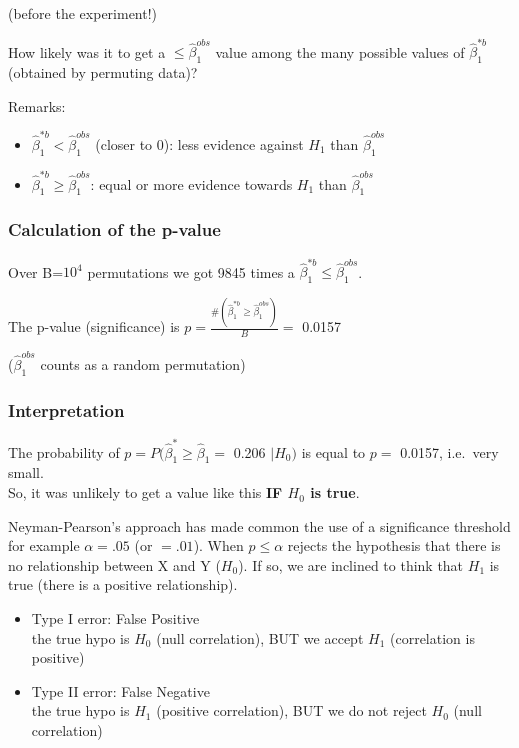 \documentclass[
]{article}
\providecommand{\tightlist}{%
  \setlength{\itemsep}{0pt}\setlength{\parskip}{0pt}}
\begin{document}
(before the experiment!)

How likely was it to get a \(\leq \hat{\beta}_1 ^{obs}\) value among the
many possible values of \(\hat{\beta}_1 ^{*b}\) (obtained by permuting
data)?

Remarks:

\begin{itemize}
\tightlist
\item
  \(\hat{\beta}_1 ^{* b}< \hat{\beta}_1 ^{obs}\) (closer to 0): less
  evidence against \(H_1\) than \(\hat{\beta}_1 ^{obs}\)
\item
  \(\hat{\beta}_1 ^{* b} \geq \hat{\beta}_1 ^{obs}\): equal or more
  evidence towards \(H_1\) than \(\hat{\beta}_1 ^{obs}\)
\end{itemize}

\hypertarget{calculation-of-the-p-value}{%
\subsubsection{Calculation of the
p-value}\label{calculation-of-the-p-value}}

Over B=\ensuremath{10^{4}} permutations we got 9845 times a
\(\hat{\beta}_1 ^{* b} \leq \hat{\beta}_1 ^{obs}\).

The p-value (significance) is
\(p=\frac{\# (\hat{\beta}_1 ^{* b} \geq \hat{\beta}_1 ^{obs})}{B} =\)
0.0157

(\(\hat{\beta}_1 ^{obs}\) counts as a random permutation)

\hypertarget{interpretation}{%
\subsubsection{Interpretation}\label{interpretation}}

The probability of \(p=P (\hat{\beta}_1 ^ * \geq \hat{\beta}_1=\) 0.206
\(| H_0)\) is equal to \(p =\) 0.0157, i.e.~very small.\\
So, it was unlikely to get a value like this \textbf{IF \(H_0\) is
true}.

Neyman-Pearson's approach has made common the use of a significance
threshold for example \(\alpha=.05\) (or \(=. 01\)). When
\(p \leq \alpha\) rejects the hypothesis that there is no relationship
between X and Y (\(H_0\)). If so, we are inclined to think that \(H_1\)
is true (there is a positive relationship).

\begin{itemize}
\tightlist
\item
  Type I error: False Positive\\
  the true hypo is \(H_0\) (null correlation), BUT we accept \(H_1\)
  (correlation is positive)
\item
  Type II error: False Negative\\
  the true hypo is \(H_1\) (positive correlation), BUT we do not reject
  \(H_0\) (null correlation)
\end{itemize}
\end{document}

